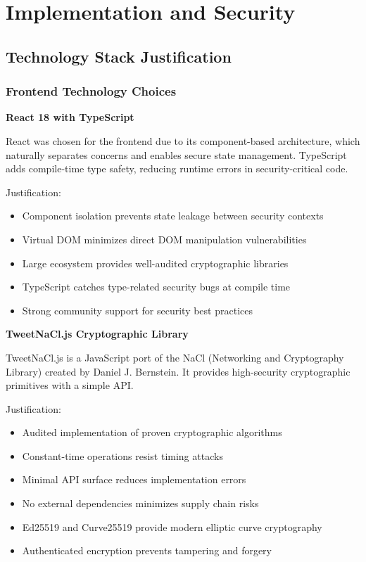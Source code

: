 \chapter{Implementation and Security}

\section{Technology Stack Justification}

\subsection{Frontend Technology Choices}

\textbf{React 18 with TypeScript}

React was chosen for the frontend due to its component-based architecture, which naturally separates concerns and enables secure state management. TypeScript adds compile-time type safety, reducing runtime errors in security-critical code.

Justification:
\begin{itemize}
    \item Component isolation prevents state leakage between security contexts
    \item Virtual DOM minimizes direct DOM manipulation vulnerabilities
    \item Large ecosystem provides well-audited cryptographic libraries
    \item TypeScript catches type-related security bugs at compile time
    \item Strong community support for security best practices
\end{itemize}

\textbf{TweetNaCl.js Cryptographic Library}

TweetNaCl.js is a JavaScript port of the NaCl (Networking and Cryptography Library) created by Daniel J. Bernstein. It provides high-security cryptographic primitives with a simple API.

Justification:
\begin{itemize}
    \item Audited implementation of proven cryptographic algorithms
    \item Constant-time operations resist timing attacks
    \item Minimal API surface reduces implementation errors
    \item No external dependencies minimizes supply chain risks
    \item Ed25519 and Curve25519 provide modern elliptic curve cryptography
    \item Authenticated encryption prevents tampering and forgery
\end{itemize}

